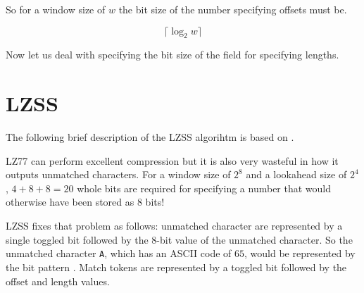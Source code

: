 So for a window size of $w$ the bit size of the number specifying
offsets must be.

\begin{equation*}
  \lceil\log_2 w\rceil
\end{equation*}

Now let us deal with specifying the bit size of the field for
specifying lengths.


\section{LZSS}

The following brief description of the LZSS algorihtm is based on
\cite{Salomon:2004:DCC,mark1996data_compression_book,mcfadden92:_hackin_data_compr_lzss,okumura:_data_compr_algor_larc_lharc}.

LZ77 can perform excellent compression but it is also very wasteful in
how it outputs unmatched characters. For a window size of $2^8$ and a
lookahead size of $2^4$, $4 + 8 + 8 = 20$ whole bits are required for
specifying a number that would otherwise have been stored as 8 bits!

LZSS fixes that problem as follows: unmatched character are
represented by a single toggled bit followed by the 8-bit value of the
unmatched character. So the unmatched character \texttt{A}, which has
an ASCII code of $65$, would be represented by the bit pattern . Match tokens are represented by a toggled bit followed
by the offset and length values.

